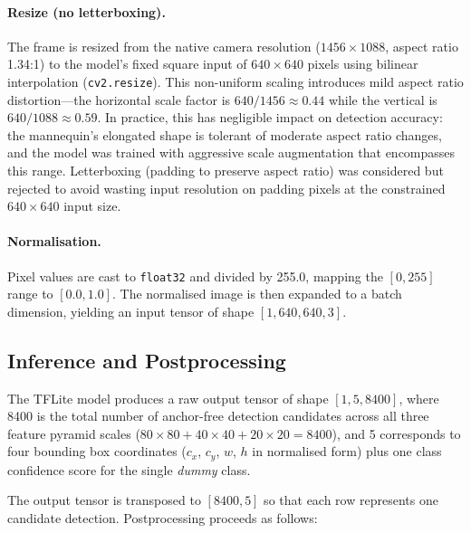 \paragraph{Resize (no letterboxing).}
The frame is resized from the native camera resolution ($1456\times1088$, aspect ratio 1.34:1) to the model's fixed square input of $640\times640$ pixels using bilinear interpolation (\texttt{cv2.resize}). This non-uniform scaling introduces mild aspect ratio distortion---the horizontal scale factor is $640/1456 \approx 0.44$ while the vertical is $640/1088 \approx 0.59$. In practice, this has negligible impact on detection accuracy: the mannequin's elongated shape is tolerant of moderate aspect ratio changes, and the model was trained with aggressive scale augmentation that encompasses this range. Letterboxing (padding to preserve aspect ratio) was considered but rejected to avoid wasting input resolution on padding pixels at the constrained $640\times640$ input size.

\paragraph{Normalisation.}
Pixel values are cast to \texttt{float32} and divided by 255.0, mapping the $[0, 255]$ range to $[0.0, 1.0]$. The normalised image is then expanded to a batch dimension, yielding an input tensor of shape $[1, 640, 640, 3]$.

\subsection{Inference and Postprocessing}\label{sec:cv:postproc}

The TFLite model produces a raw output tensor of shape $[1, 5, 8400]$, where 8400 is the total number of anchor-free detection candidates across all three feature pyramid scales ($80\times80 + 40\times40 + 20\times20 = 8400$), and 5 corresponds to four bounding box coordinates ($c_x$, $c_y$, $w$, $h$ in normalised form) plus one class confidence score for the single \textit{dummy} class.

The output tensor is transposed to $[8400, 5]$ so that each row represents one candidate detection. Postprocessing proceeds as follows:

